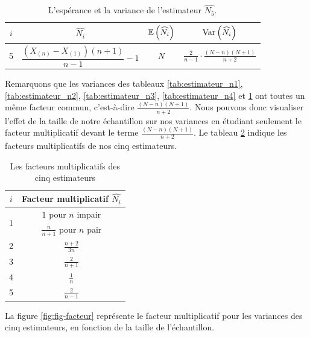 \documentclass[10pt]{article}
\begin{document}
\begin{table}[ht]
\begin{center}
\begin{tabular}{|c|c|c|c|}
\hline
$i$ & $\widehat{N_i}$ & $\operatorname{\mathbb{E}}\left(\widehat{N_i}\right)$ & $\operatorname{Var}\left(\widehat{N_i}\right)$ \\
\hline
\hline
5 & $\dfrac{(X_{(n)}-X_{(1)})(n+1)}{n-1}-1$ & $N$ & $\frac{2}{n-1}\cdot\frac{(N-n)(N+1)}{n+2}$ \\
\hline
\end{tabular}
\end{center}
\caption{\label{tab:estimateur_n5} {L'espérance et la variance de l'estimateur $\widehat{N_5}$.} }
\end{table}

Remarquons que les variances des tableaux \ref{tab:estimateur_n1},
\ref{tab:estimateur_n2}, \ref{tab:estimateur_n3},
\ref{tab:estimateur_n4} et \ref{tab:estimateur_n5} ont toutes un même
facteur commun, c'est-à-dire \(\frac{(N-n)(N+1)}{n+2}\). Nous pouvons
donc visualiser l'effet de la taille de notre échantillon sur nos
variances en étudiant seulement le facteur multiplicatif devant le terme
\(\frac{(N-n)(N+1)}{n+2}\). Le tableau \ref{tab:facteur_multiplicatif}
indique les facteurs multiplicatifs de nos cinq estimateurs.

\begin{table}[ht]
\begin{center}
\begin{tabular}{|c|c|}
\hline
$i$ & Facteur multiplicatif $\widehat{N_i}$ \\
\hline
\hline
\multirow{2}{*}{1} & $1$ pour $n$ impair \\
& $\frac{n}{n+1}$ pour $n$ pair \\
\hline
2 & $\frac{n+2}{3n}$ \\
\hline
3 & $\frac{2}{n+1}$ \\
\hline
4 & $\frac{1}{n}$ \\
\hline
5 & $\frac{2}{n-1}$ \\
\hline
\end{tabular}
\end{center}
\caption{\label{tab:facteur_multiplicatif}{Les facteurs multiplicatifs des cinq estimateurs}}
\end{table}

La figure \ref{fig:fig-facteur} représente le facteur multiplicatif pour
les variances des cinq estimateurs, en fonction de la taille de
l'échantillon.
\end{document}
